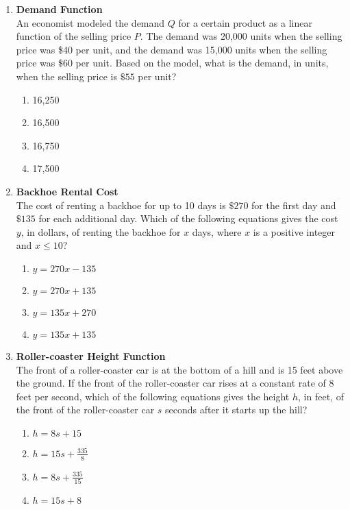 \begin{enumerate}
\item \textbf{Demand Function}\\
An economist modeled the demand $Q$ for a certain product as a linear function of the selling price $P$. The demand was 20,000 units when the selling price was \$40 per unit, and the demand was 15,000 units when the selling price was $\$ 60$ per unit. Based on the model, what is the demand, in units, when the selling price is $\$ 55$ per unit?
\begin{enumerate}[label=(\Alph*)]
  \item 16,250
  \item 16,500
  \item 16,750
  \item 17,500
\end{enumerate}
\begin{subanswer}
\end{subanswer}

\item \textbf{Backhoe Rental Cost}\\
The cost of renting a backhoe for up to 10 days is $\$ 270$ for the first day and $\$ 135$ for each additional day. Which of the following equations gives the cost $y$, in dollars, of renting the backhoe for $x$ days, where $x$ is a positive integer and $x \leq 10$?
\begin{enumerate}[label=(\Alph*)]
  \item $y = 270x - 135$
  \item $y = 270x + 135$
  \item $y = 135x + 270$
  \item $y = 135x + 135$
\end{enumerate}
\begin{subanswer}
\end{subanswer}

\item \textbf{Roller-coaster Height Function}\\
The front of a roller-coaster car is at the bottom of a hill and is 15 feet above the ground. If the front of the roller-coaster car rises at a constant rate of 8 feet per second, which of the following equations gives the height $h$, in feet, of the front of the roller-coaster car $s$ seconds after it starts up the hill?
\begin{enumerate}[label=(\Alph*)]
  \item $h = 8s + 15$
  \item $h = 15s + \frac{335}{8}$
  \item $h = 8s + \frac{335}{15}$
  \item $h = 15s + 8$
\end{enumerate}
\begin{subanswer}
\end{subanswer}


\end{enumerate}
